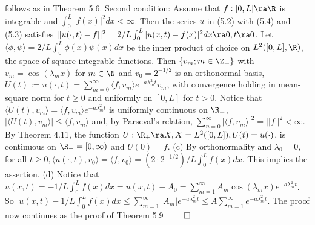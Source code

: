 follows as in Theorem 5.6.  Second condition:  Assume that $f: [0,L] \ra \R$ is integrable and $\int_0^L|f(x)|^2 dx < \infty$. Then the series $u$ in (5.2) with (5.4) and (5.3) satisfies $|| u(\cdot, t) - f||^2 = 2/L \int_0^L |u(x,t)-f(x)|^2 dx \ra 0, t \ra 0$. Let $\langle \phi, \psi \rangle = 2/L \int_0^L \phi(x) \psi(x) dx$ be the inner product of choice on $L^2([0,L], \R)$, the space of square integrable functions.  Then $\{v_m;m\in \Z_+\}$ with $v_m=\cos(\lambda_mx)$ for $m \in \N$ and $v_0 = 2^{-1/2}$ is an orthonormal basis, $U(t) := u(\cdot, t) =  \sum_{m=0}^{\infty} \langle f, v_m \rangle e^{-a \lambda_m^2 t} v_m$, with convergence holding in mean-square norm for $t \geq 0$ and uniformly on $[0,L]$ for $t>0$. Notice that $\langle U(t), v_m \rangle = \langle f, v_m \rangle e^{-a \lambda_m^2 t}$ is uniformly continuous on $\R_+$, $|\langle U(t), v_m \rangle| \leq \langle f, v_m \rangle$ and, by Parseval's relation, $\sum_{n=0}^{\infty} |\langle f, v_m \rangle|^2 = ||f||^2 < \infty$. By Theorem 4.11, the function $U: \R_+ \ra X, X = L^2([0,L]), U(t)=u(\cdot)$, is continuous on $\R_+ = [0,\infty)$ and $U(0)=f$. (c) By orthonormality and $\lambda_0 = 0$, for all $t \geq 0, \langle u(\cdot, t), v_0 \rangle = \langle f, v_0 \rangle = (2 \cdot 2^{-1/2})/L\int_0^L f(x)dx$. This implies the assertion. (d) Notice that $u(x,t)=-1/L\int_0^Lf(x)dx=u(x,t)-A_0 = \sum_{m=1}^{\infty}A_m \cos(\lambda_mx)e^{-a \lambda_m^2 t}$. So $|u(x,t)-1/L\int_0^Lf(x)dx\leq \sum_{m=1}^{\infty} |A_m |e^{-a \lambda_m^2 t} \leq A \sum_{m=1}^{\infty} e^{-a \lambda_m^2 t}$.  The proof now continues as the proof of Theorem 5.9 $\qed$